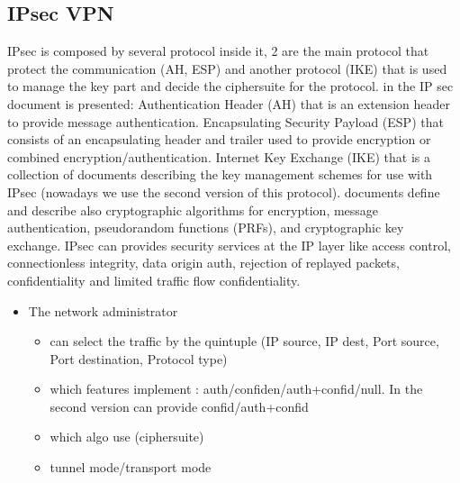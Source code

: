 \documentclass{article}
\begin{document}
\subsection{IPsec VPN}
IPsec is composed by several protocol inside it, 2 are the main protocol that protect the communication (AH, ESP) and another protocol (IKE) that is used to manage the key part and decide the ciphersuite for the protocol.
in the IP sec document is presented:
Authentication Header (AH) that is an extension header to provide message authentication.
Encapsulating Security Payload (ESP) that consists of an encapsulating header and trailer used to provide encryption or combined encryption/authentication.
Internet Key Exchange (IKE) that is a collection of documents describing the key management schemes for use with IPsec (nowadays we use the second version of this protocol).
documents define and describe also cryptographic algorithms for encryption, message authentication, pseudorandom functions (PRFs), and cryptographic key exchange.
IPsec can provides security services at the IP layer like access control, connectionless integrity, data origin auth, rejection of replayed packets, confidentiality and limited traffic flow confidentiality.
\begin{itemize}
    \item The network administrator
    \begin{itemize}
        \item can select the traffic by the quintuple (IP source, IP dest, Port source, Port destination, Protocol type)
        \item which features implement : auth/confiden/auth+confid/null. In the second version can provide confid/auth+confid
        \item which algo use (ciphersuite)
        \item tunnel mode/transport mode 
    \end{itemize}
\end{itemize}
 
\end{document}
